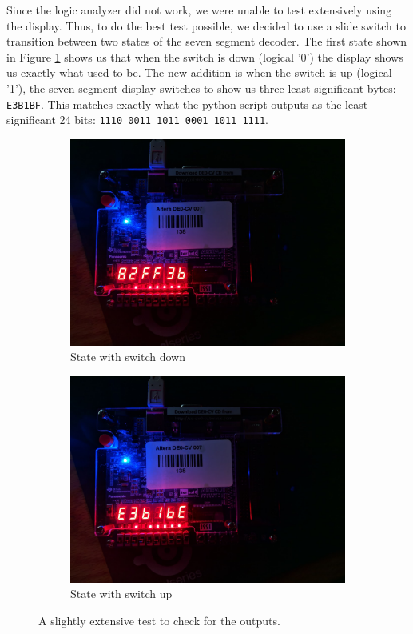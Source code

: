 \documentclass[letterpaper, 12pt]{article} %
\begin{document}
Since the logic analyzer did not work, we were unable to test extensively using the display. Thus, to do the best test possible, we decided to use a slide switch to transition between two states of the seven segment decoder. The first state shown in Figure \ref{fpgaswd} shows us that when the switch is down (logical '0') the display shows us exactly what used to be. The new addition is when the switch is up (logical '1'), the seven segment display switches to show us three least significant bytes: \texttt{E3B1BF}.
This matches exactly what the python script outputs as the least significant 24 bits: \texttt{1110 0011 1011 0001 1011 1111}.\par
\begin{figure}[ht]
\centering
\begin{subfigure}{.5\textwidth}
  \centering
  \includegraphics[width=0.99\linewidth]{files/switch_down}
  \caption{State with switch down}
  \label{fpgaswd}
\end{subfigure}%
\begin{subfigure}{.5\textwidth}
  \centering
  \includegraphics[width=0.99\linewidth]{files/switch_up}
  \caption{State with switch up}
  \label{fpgaswu}
\end{subfigure}
\caption{A slightly extensive test to check for the outputs.}
\label{fig:second}
\end{figure}
\end{document}
